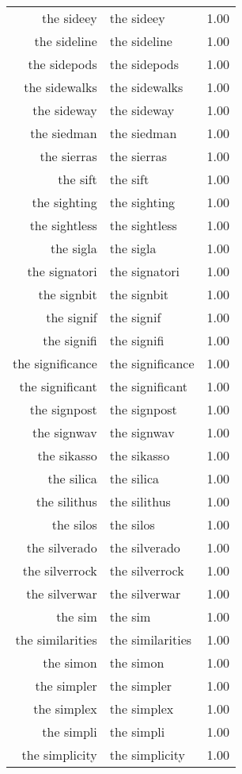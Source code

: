 \begin{table}[ht]
\begin{tabular}{rlr}
  the sideey & the sideey & 1.00 \\ 
  the sideline & the sideline & 1.00 \\ 
  the sidepods & the sidepods & 1.00 \\ 
  the sidewalks & the sidewalks & 1.00 \\ 
  the sideway & the sideway & 1.00 \\ 
  the siedman & the siedman & 1.00 \\ 
  the sierras & the sierras & 1.00 \\ 
  the sift & the sift & 1.00 \\ 
  the sighting & the sighting & 1.00 \\ 
  the sightless & the sightless & 1.00 \\ 
  the sigla & the sigla & 1.00 \\ 
  the signatori & the signatori & 1.00 \\ 
  the signbit & the signbit & 1.00 \\ 
  the signif & the signif & 1.00 \\ 
  the signifi & the signifi & 1.00 \\ 
  the significance & the significance & 1.00 \\ 
  the significant & the significant & 1.00 \\ 
  the signpost & the signpost & 1.00 \\ 
  the signwav & the signwav & 1.00 \\ 
  the sikasso & the sikasso & 1.00 \\ 
  the silica & the silica & 1.00 \\ 
  the silithus & the silithus & 1.00 \\ 
  the silos & the silos & 1.00 \\ 
  the silverado & the silverado & 1.00 \\ 
  the silverrock & the silverrock & 1.00 \\ 
  the silverwar & the silverwar & 1.00 \\ 
  the sim & the sim & 1.00 \\ 
  the similarities & the similarities & 1.00 \\ 
  the simon & the simon & 1.00 \\ 
  the simpler & the simpler & 1.00 \\ 
  the simplex & the simplex & 1.00 \\ 
  the simpli & the simpli & 1.00 \\ 
  the simplicity & the simplicity & 1.00 \\ 

\end{tabular}
\end{table}
